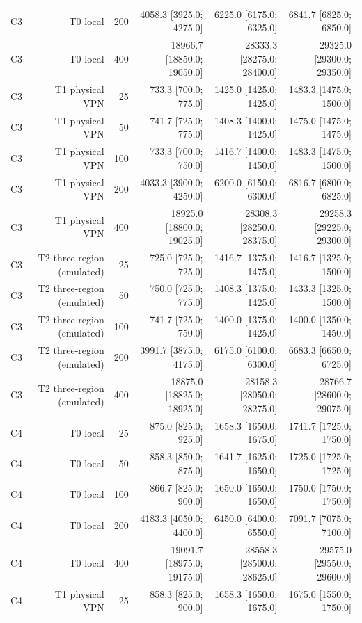 \begin{table}[t]
\begin{tabular}{lrrrrr}
C3 & T0 local & 200 & 4058.3 [3925.0; 4275.0] & 6225.0 [6175.0; 6325.0] & 6841.7 [6825.0; 6850.0] \\
C3 & T0 local & 400 & 18966.7 [18850.0; 19050.0] & 28333.3 [28275.0; 28400.0] & 29325.0 [29300.0; 29350.0] \\
C3 & T1 physical VPN & 25 & 733.3 [700.0; 775.0] & 1425.0 [1425.0; 1425.0] & 1483.3 [1475.0; 1500.0] \\
C3 & T1 physical VPN & 50 & 741.7 [725.0; 775.0] & 1408.3 [1400.0; 1425.0] & 1475.0 [1475.0; 1475.0] \\
C3 & T1 physical VPN & 100 & 733.3 [700.0; 750.0] & 1416.7 [1400.0; 1450.0] & 1483.3 [1475.0; 1500.0] \\
C3 & T1 physical VPN & 200 & 4033.3 [3900.0; 4250.0] & 6200.0 [6150.0; 6300.0] & 6816.7 [6800.0; 6825.0] \\
C3 & T1 physical VPN & 400 & 18925.0 [18800.0; 19025.0] & 28308.3 [28250.0; 28375.0] & 29258.3 [29225.0; 29300.0] \\
C3 & T2 three-region (emulated) & 25 & 725.0 [725.0; 725.0] & 1416.7 [1375.0; 1475.0] & 1416.7 [1325.0; 1500.0] \\
C3 & T2 three-region (emulated) & 50 & 750.0 [725.0; 775.0] & 1408.3 [1375.0; 1425.0] & 1433.3 [1325.0; 1500.0] \\
C3 & T2 three-region (emulated) & 100 & 741.7 [725.0; 750.0] & 1400.0 [1375.0; 1425.0] & 1400.0 [1350.0; 1450.0] \\
C3 & T2 three-region (emulated) & 200 & 3991.7 [3875.0; 4175.0] & 6175.0 [6100.0; 6300.0] & 6683.3 [6650.0; 6725.0] \\
C3 & T2 three-region (emulated) & 400 & 18875.0 [18825.0; 18925.0] & 28158.3 [28050.0; 28275.0] & 28766.7 [28600.0; 29075.0] \\
C4 & T0 local & 25 & 875.0 [825.0; 925.0] & 1658.3 [1650.0; 1675.0] & 1741.7 [1725.0; 1750.0] \\
C4 & T0 local & 50 & 858.3 [850.0; 875.0] & 1641.7 [1625.0; 1650.0] & 1725.0 [1725.0; 1725.0] \\
C4 & T0 local & 100 & 866.7 [825.0; 900.0] & 1650.0 [1650.0; 1650.0] & 1750.0 [1750.0; 1750.0] \\
C4 & T0 local & 200 & 4183.3 [4050.0; 4400.0] & 6450.0 [6400.0; 6550.0] & 7091.7 [7075.0; 7100.0] \\
C4 & T0 local & 400 & 19091.7 [18975.0; 19175.0] & 28558.3 [28500.0; 28625.0] & 29575.0 [29550.0; 29600.0] \\
C4 & T1 physical VPN & 25 & 858.3 [825.0; 900.0] & 1658.3 [1650.0; 1675.0] & 1675.0 [1550.0; 1750.0] \\

\end{tabular}
\end{table}
